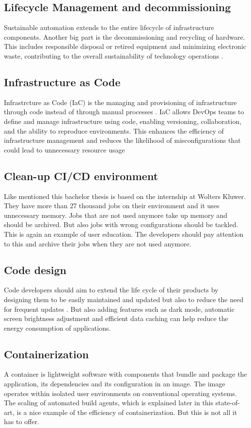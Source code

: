 \subsection{Lifecycle Management and decommissioning}
Sustainable automation extends to the entire lifecycle of infrastructure components. Another big part is the decommissioning and recycling of hardware. This includes responsible disposal or retired equipment and minimizing electronic waste, contributing to the overall sustainability of technology operations \autocite{Festus2024}.


\subsection{Infrastructure as Code}
Infrastrcture as Code (IaC) is the managing and provisioning of infrastructure through code instead of through manual processes \autocite{RedHat2022}. IaC allows DevOps teams to define and manage infrastructure using code, enabling versioning, collaboration, and the ability to reproduce environments. This enhances the efficiency of infrastructure management and reduces the likelihood of misconfigurations that could lead to unnecessary resource usage \autocite{Festus2024}


\subsection{Clean-up CI/CD environment}
Like mentioned this bachelor thesis is based on the internship at Wolters Kluwer. They have more than 27 thousand jobs on their environment and it uses unnecessary memory. 
Jobs that are not used anymore take up memory and should be archived. But also jobs with wrong configurations should be tackled.
This is again an example of user education. The developers should pay attention to this and archive their jobs when they are not used anymore.


\subsection{Code design}
Code developers should aim to extend the life cycle of their products by designing them to be easily maintained and updated but also to reduce the need for frequent updates \autocite{Zudu2024}.
But also adding features such as dark mode, automatic screen brightness adjustment and efficient data caching can help reduce the energy consumption of applications.


\subsection{Containerization}
A container is lightweight software with components that bundle and package the application, its dependencies and its configuration in an image. The image operates within isolated user environments on conventional operating systems.
The scaling of automated build agents, which is explained later in this state-of-art, is a nice example of the efficiency of containerization. But this is not all it has to offer.

